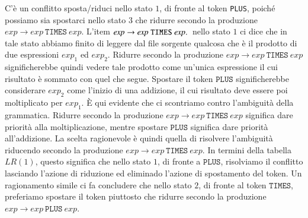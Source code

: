 C'\`e un conflitto sposta/riduci
nello stato $1$, di fronte al token \texttt{PLUS}, poich\'e
possiamo sia spostarci nello stato $3$ che ridurre secondo la produzione
$\mathit{exp}\to\mathit{exp}\ \mathtt{TIMES}\ \mathit{exp}$. L'item
$\mathit{exp}\to\mathit{exp}\ \mathtt{TIMES}\ \mathit{exp}\idot$ nello
stato $1$ ci dice che in tale stato abbiamo finito di leggere dal file
sorgente qualcosa che \`e il prodotto di due espressioni $\mathit{exp}_1$
ed $\mathit{exp}_2$. Ridurre secondo
la produzione $\mathit{exp}\to\mathit{exp}\ \mathtt{TIMES}\ \mathit{exp}$
significherebbe quindi vedere tale prodotto come un'unica espressione il cui
risultato \`e sommato con quel che segue.
Spostare il token $\mathtt{PLUS}$ significherebbe considerare
$\mathit{exp}_2$ come l'inizio di una addizione, il cui risultato deve
essere poi moltiplicato per $\mathit{exp}_1$. \`E qui evidente che
ci scontriamo contro l'ambiguit\`a della grammatica. Ridurre secondo la
produzione $\mathit{exp}\to\mathit{exp}\ \mathtt{TIMES}\ \mathit{exp}$
significa dare priorit\`a alla moltiplicazione, mentre spostare
$\mathtt{PLUS}$ significa dare priorit\`a all'addizione. La scelta ragionevole
\`e quindi quella di risolvere l'ambiguit\`a riducendo secondo la produzione
$\mathit{exp}\to\mathit{exp}\ \mathtt{TIMES}\ \mathit{exp}$. In termini della
tabella $\mathit{LR}(1)$, questo significa che nello stato $1$, di fronte
a $\mathtt{PLUS}$, risolviamo il conflitto
lasciando l'azione di riduzione ed eliminado l'azione di spostamento del token.
Un ragionamento simile ci fa concludere che nello stato $2$,
di fronte al token $\mathtt{TIMES}$, preferiamo spostare il token
piuttosto che ridurre secondo la produzione
$\mathit{exp}\to\mathit{exp}\ \mathtt{PLUS}\ \mathit{exp}$.


